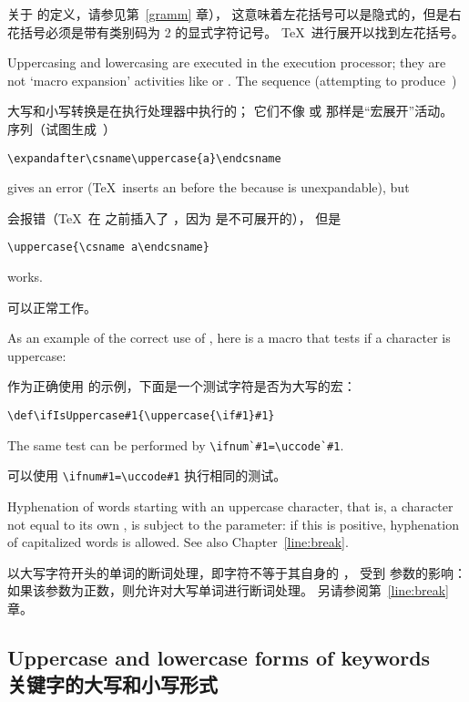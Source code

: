关于  的定义，请参见第~\ref{gramm} 章），
这意味着左花括号可以是隐式的，但是右花括号必须是带有类别码为 2 的显式字符记号。
\TeX\ 进行展开以找到左花括号。

Uppercasing and lowercasing are executed in the execution processor;
they are not `macro expansion' activities
like  or .
The sequence (attempting to produce~)

大写和小写转换是在执行处理器中执行的；
它们不像  或  那样是“宏展开”活动。
序列（试图生成~）
\begin{verbatim}
\expandafter\csname\uppercase{a}\endcsname
\end{verbatim}
gives an error (\TeX\ inserts an  before   the
 because  is unexpandable), but

会报错（\TeX\ 在  之前插入了 ，因为  是不可展开的），
但是
\begin{verbatim}
\uppercase{\csname a\endcsname}
\end{verbatim}
works.

可以正常工作。

As an example of the correct use of , here
is a macro that tests if a character is uppercase:

作为正确使用  的示例，下面是一个测试字符是否为大写的宏：
\begin{verbatim}
\def\ifIsUppercase#1{\uppercase{\if#1}#1}
\end{verbatim}
The same test can be
performed by \verb>\ifnum`#1=\uccode`#1>.

可以使用 \verb>\ifnum#1=\uccode#1> 执行相同的测试。



Hyphenation of words starting with an uppercase character,
that is, a character not equal to its own ,
is subject to the  parameter: if this
is positive, hyphenation of capitalized words is allowed.
See also Chapter~\ref{line:break}.

以大写字符开头的单词的断词处理，即字符不等于其自身的 ，
受到  参数的影响：如果该参数为正数，则允许对大写单词进行断词处理。
另请参阅第~\ref{line:break} 章。


\subsection{Uppercase and lowercase forms of keywords\\关键字的大写和小写形式}

